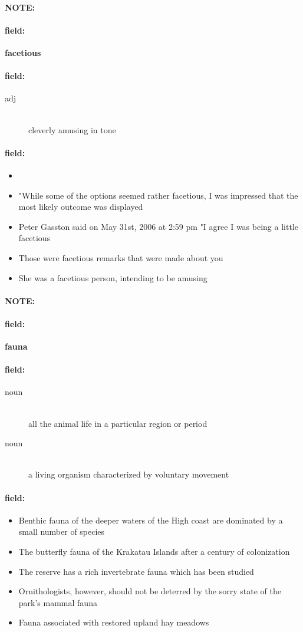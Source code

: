 \documentclass[12pt]{article}
\newenvironment{note}{\paragraph{NOTE:}}{}
\newenvironment{field}{\paragraph{field:}}{}
\begin{document}
\begin{note}
\begin{field}
\textbf{\large facetious}
\end{field}


\begin{field}
\begin{description}
\item[adj] \hfill \\ 
cleverly amusing in tone

\end{description}
\end{field}

\begin{field}
\begin{itemize}
\item 
\item "While some of the options seemed rather facetious, I was impressed that the most likely outcome was displayed
\item Peter Gasston said on May 31st, 2006 at 2:59 pm "I agree I was being a little facetious
\item Those were facetious remarks that were made about you
\item She was a facetious person, intending to be amusing
\end{itemize}
\end{field}
\end{note}
\begin{note}
\begin{field}
\textbf{\large fauna}
\end{field}


\begin{field}
\begin{description}
\item[noun] \hfill \\ 
all the animal life in a particular region or period

\item[noun] \hfill \\ 
a living organism characterized by voluntary movement

\end{description}
\end{field}

\begin{field}
\begin{itemize}
\item Benthic fauna of the deeper waters of the High coast are dominated by a small number of species
\item The butterfly fauna of the Krakatau Islands after a century of colonization
\item The reserve has a rich invertebrate fauna which has been studied
\item Ornithologists, however, should not be deterred by the sorry state of the park's mammal fauna
\item Fauna associated with restored upland hay meadows
\end{itemize}
\end{field}
\end{note}
\end{document}
